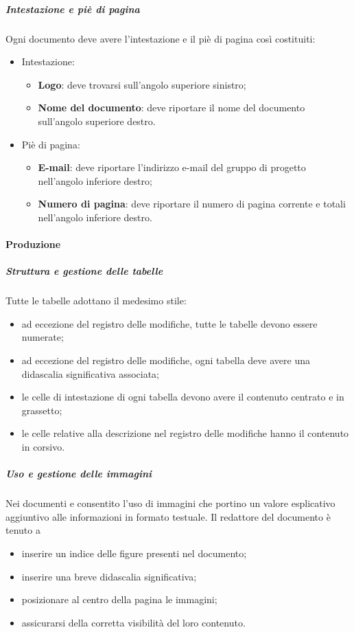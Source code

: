   \subparagraph*{Intestazione e piè di pagina}
	Ogni documento deve avere l'intestazione e il piè di pagina così costituiti:
	\begin{itemize}
		\item Intestazione:
		\begin{itemize}
			\item \textbf{Logo}: deve trovarsi sull'angolo superiore sinistro;
			\item \textbf{Nome del documento}: deve riportare il nome del documento sull'angolo superiore destro.
		\end{itemize}
		\item Piè di pagina:
		\begin{itemize}
			\item \textbf{E-mail}: deve riportare l'indirizzo e-mail del gruppo di progetto
			nell'angolo inferiore destro;
			\item \textbf{Numero di pagina}: deve riportare il numero di pagina corrente e totali
			nell'angolo inferiore destro.
		\end{itemize}
	\end{itemize}

  \paragraph{Produzione}
  \subparagraph*{Struttura e gestione delle tabelle}
  Tutte le tabelle adottano il medesimo stile:
  \begin{itemize}
  	\item ad eccezione del registro delle modifiche, tutte le tabelle devono essere numerate;
  	\item ad eccezione del registro delle modifiche, ogni tabella deve avere una didascalia significativa associata;
  	\item le celle di intestazione di ogni tabella devono avere il contenuto centrato e in grassetto;
  	\item le celle relative alla descrizione nel registro delle modifiche hanno il contenuto in corsivo.
  \end{itemize}

  \subparagraph*{Uso e gestione delle immagini}
  Nei documenti e consentito l'uso di immagini che portino un valore esplicativo
  aggiuntivo alle informazioni in formato testuale. Il redattore del documento è tenuto a
  \begin{itemize}
  	\item inserire un indice delle figure presenti nel documento;
  	\item inserire una breve didascalia significativa;
  	\item posizionare al centro della pagina le immagini;
  	\item assicurarsi della corretta visibilità del loro contenuto.
  \end{itemize}

